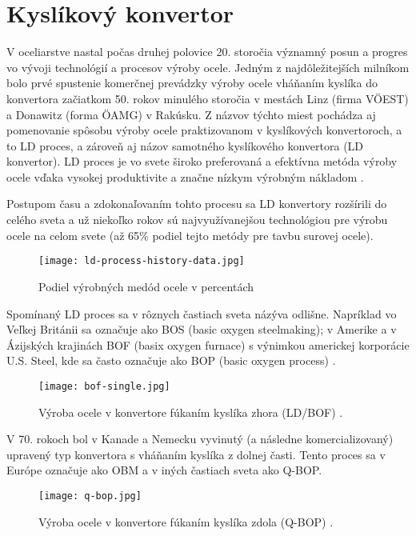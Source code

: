 \section{Kyslíkový konvertor}

V oceliarstve nastal počas druhej polovice 20. storočia významný posun a progres vo vývoji technológií a procesov výroby ocele. Jedným z najdôležitejších milníkom bolo prvé spustenie komerčnej prevádzky výroby ocele vháňaním kyslíka do konvertora začiatkom 50. rokov minulého storočia v mestách Linz (firma VÖEST) a Donawitz (forma ÖAMG) v Rakúsku. Z názvov týchto miest pochádza aj pomenovanie spôsobu výroby ocele praktizovanom v kyslíkových konvertoroch, a to LD proces, a zároveň aj názov samotného kyslíkového konvertora (LD konvertor). LD proces je vo svete široko preferovaná a efektívna metóda výroby ocele vďaka vysokej produktivite a značne nízkym výrobným nákladom \cite{Wang2010}.

Postupom času a zdokonaľovaním tohto procesu sa LD konvertory rozšírili do celého sveta a už niekoľko rokov sú najvyužívanejšou technológiou pre výrobu ocele na celom svete (až 65\% podiel tejto metódy pre tavbu surovej ocele).

\begin{figure}[h!]
\centering
\texttt{[image: ld-process-history-data.jpg]}
\caption{Podiel výrobných medód ocele v percentách \citep{voestalpineLD2012}}
\label{o:1}
\end{figure}

Spomínaný LD proces sa v rôznych častiach sveta názýva odlišne. Napríklad vo Veľkej Británii sa označuje ako BOS (basic oxygen steelmaking); v Amerike a v Ázijských krajinách BOF (basix oxygen furnace) s výnimkou americkej korporácie U.S. Steel, kde sa často označuje ako BOP (basic oxygen process) \citep{Turkdogan1996}.

\begin{figure}[h!]
\centering
\texttt{[image: bof-single.jpg]}
\caption{Výroba ocele v konvertore fúkaním kyslíka zhora (LD/BOF) \citep{Turkdogan1996}.}
\label{o:2}
\end{figure}

V 70. rokoch bol v Kanade a Nemecku vyvinutý (a následne komercializovaný) upravený typ konvertora s vháňaním kyslíka z dolnej časti. Tento proces sa v Európe označuje ako OBM a v iných častiach sveta ako Q-BOP.

\begin{figure}[h!]
\centering
\texttt{[image: q-bop.jpg]}
\caption{Výroba ocele v konvertore fúkaním kyslíka zdola (Q-BOP) \citep{Turkdogan1996}.}
\label{o:3}
\end{figure}

